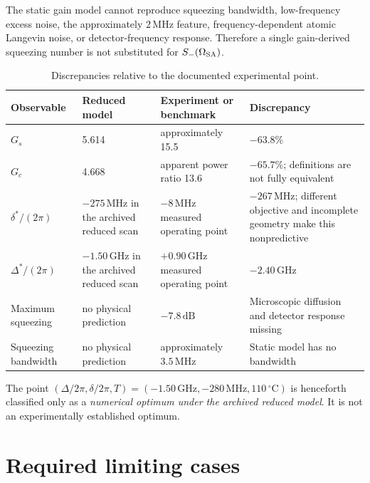 \documentclass[11pt,a4paper]{article}
\newcommand{\GHz}{\,\mathrm{GHz}}
\newcommand{\MHz}{\,\mathrm{MHz}}
\newcommand{\dB}{\,\mathrm{dB}}
\newcommand{\degC}{\,^{\circ}\mathrm C}
\begin{document}
The static gain model cannot reproduce squeezing bandwidth,
low-frequency excess noise, the approximately $2\MHz$ feature,
frequency-dependent atomic Langevin noise, or detector-frequency response.
Therefore a single gain-derived squeezing number is not substituted for
$S_-(\Omega_{\rm SA})$.

\begin{table}[ht]
\centering
\caption{Discrepancies relative to the documented experimental point.}
\label{tab:discrepancies}
\small
\begin{tabularx}{\textwidth}{L{3.0cm}L{3.5cm}L{3.2cm}Y}
\toprule
Observable & Reduced model & Experiment or benchmark & Discrepancy\\
\midrule
$G_s$ & 5.614 & approximately 15.5 & $-63.8\%$\\
$G_c$ & 4.668 & apparent power ratio 13.6 & $-65.7\%$;
definitions are not fully equivalent\\
$\delta^*/(2\pi)$ & $-275\MHz$ in the archived reduced scan &
$-8\MHz$ measured operating point & $-267\MHz$; different objective and
incomplete geometry make this nonpredictive\\
$\Delta^*/(2\pi)$ & $-1.50\GHz$ in the archived reduced scan &
$+0.90\GHz$ measured operating point & $-2.40\GHz$\\
Maximum squeezing & no physical prediction & $-7.8\dB$ &
Microscopic diffusion and detector response missing\\
Squeezing bandwidth & no physical prediction & approximately $3.5\MHz$ &
Static model has no bandwidth\\
\bottomrule
\end{tabularx}
\end{table}

The point
$(\Delta/2\pi,\delta/2\pi,T)=(-1.50\GHz,-280\MHz,110\degC)$ is henceforth
classified only as
a \emph{numerical optimum under the archived reduced model}. It is not an
experimentally established optimum.

\clearpage
\section{Required limiting cases}
\end{document}
